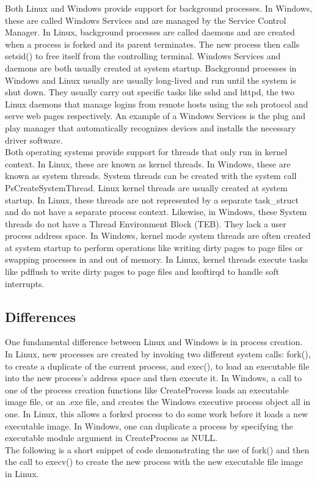 \documentclass[letterpaper,10pt,titlepage]{article}
\begin{document}
\linebreak
Both Linux and Windows provide support for background processes. In Windows,
these are called Windows Services and are managed by the Service Control 
Manager. In Linux, background processes are called daemons and are created 
when a process is forked and its parent terminates. The new process then calls
setsid() to free itself from the controlling terminal. Windows Services and 
daemons are both usually created at system startup. Background processes in
Windows and Linux usually are usually long-lived and run until the system 
is shut down. They usually carry out specific tasks like sshd and httpd, the
two Linux daemons that manage logins from remote hosts using the ssh protocol
and serve web pages respectively. An example of a Windows Services is 
the plug and play manager that automatically recognizes devices and installs
the necessary driver software.
\\
\linebreak
Both operating systems provide support for threads that only run in kernel 
context. In Linux, these are known as kernel threads. In Windows, these are 
known as system threads. System threads can be created with the system call
PsCreateSystemThread. Linux kernel threads are usually created at system 
startup. In Linux, these threads are not represented by a separate task\_struct
and do not have a separate process context. Likewise, in Windows, these
System threads do not have a Thread Environment Block (TEB). They lack a user
process address space. In Windows, kernel mode system threads are often 
created at system startup to perform operations like writing dirty pages to
page files or swapping processes in and out of memory. In Linux, kernel 
threads execute tasks like pdflush to write dirty pages to page files and 
ksoftirqd to handle soft interrupts.
\subsection{Differences}

One fundamental difference between Linux and Windows is in process creation. 
In Linux, new processes are created by invoking two different system calls:
fork(), to create a duplicate of the current process, and exec(), to load an
executable file into the new process's address space and then execute it. 
In Windows, a call to one of the process creation functions like CreateProcess
loads an executable image file, or an .exe file, and creates the Windows
executive process object all in one. In Linux, this allows a forked process
to do some work before it loads a new executable image. In Windows, one can
duplicate a process by specifying the executable module argument in 
CreateProcess as NULL. 
\\
\linebreak
The following is a short snippet of code demonstrating the use of fork() and
then the call to execv() to create the new process with the new executable
file image in Linux.
\end{document}
